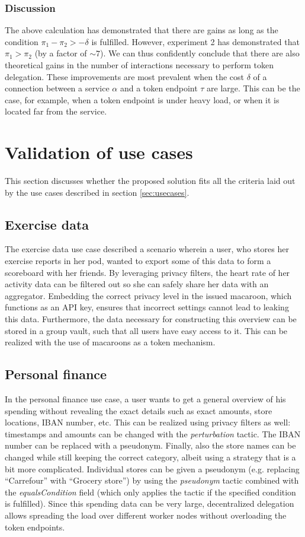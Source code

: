 \subsubsection{Discussion}
The above calculation has demonstrated that there are gains as long as the condition $\pi_1 - \pi_2 > -\delta$ is fulfilled. However, experiment 2 has demonstrated that $\pi_1 > \pi_2$ (by a factor of $\sim 7$). We can thus confidently conclude that there are also theoretical gains in the number of interactions necessary to perform token delegation. These improvements are most prevalent when the cost $\delta$ of a connection between a service $\alpha$ and a token endpoint $\tau$ are large. This can be the case, for example, when a token endpoint is under heavy load, or when it is located far from the service.


\section{Validation of use cases}
This section discusses whether the proposed solution fits all the criteria laid out by the use cases described in section \ref{sec:usecases}.

\subsection{Exercise data}
The exercise data use case described a scenario wherein a user, who stores her exercise reports in her pod, wanted to export some of this data to form a scoreboard with her friends. By leveraging privacy filters, the heart rate of her activity data can be filtered out so she can safely share her data with an aggregator. Embedding the correct privacy level in the issued macaroon, which functions as an API key, ensures that incorrect settings cannot lead to leaking this data. Furthermore, the data necessary for constructing this overview can be stored in a group vault, such that all users have easy access to it. This can be realized with the use of macaroons as a token mechanism. 

\subsection{Personal finance}
In the personal finance use case, a user wants to get a general overview of his spending without revealing the exact details such as exact amounts, store locations, IBAN number, etc. This can be realized using privacy filters as well: timestamps and amounts can be changed with the \textit{perturbation} tactic. The IBAN number can be replaced with a pseudonym. Finally, also the store names can be changed while still keeping the correct category, albeit using a strategy that is a bit more complicated. Individual stores can be given a pseudonym (e.g. replacing ``Carrefour'' with ``Grocery store'') by using the \textit{pseudonym} tactic combined with the \textit{equalsCondition} field (which only applies the tactic if the specified condition is fulfilled). Since this spending data can be very large, decentralized delegation allows spreading the load over different worker nodes without overloading the token endpoints.


